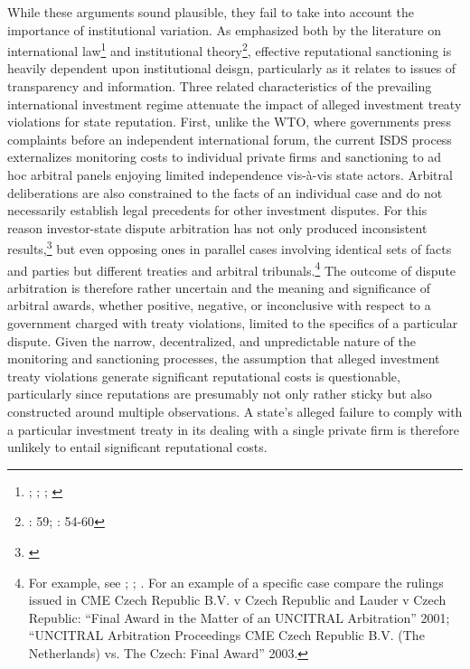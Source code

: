 \documentclass[12pt,onesided]{amsart}
\begin{document}
While these arguments sound plausible, they fail to take into account the importance of institutional variation. As emphasized both by the literature on international law\footnote{\citet{staton2011judicial}; \citet{cavallaro2008reevaluating}; \citet{guzman2008reputation}; \citet{guzman2008international}} and institutional theory\footnote{\citet{knight1992institutions}: 59; \citet{north1990institutions}: 54-60}, effective reputational sanctioning is heavily dependent upon institutional deisgn, particularly as it relates to issues of transparency and information. Three related characteristics of the prevailing international investment regime attenuate the impact of alleged investment treaty violations for state reputation. First, unlike the WTO, where governments press complaints before an independent international forum, the current ISDS process externalizes monitoring costs to individual private firms and sanctioning to ad hoc arbitral panels enjoying limited independence vis-\`{a}-vis state actors. Arbitral deliberations are also constrained to the facts of an individual case and do not necessarily establish legal precedents for other investment disputes. For this reason investor-state dispute arbitration has not only produced inconsistent results,\footnote{\citet{franck:2005}} but even opposing ones in parallel cases involving identical sets of facts and parties but different treaties and arbitral tribunals.\footnote{For example, see \citet{franck:2005}; \citet{kim2011annulment}; \citet{egli2006don}. For an example of a specific case compare the rulings issued in CME Czech Republic B.V. v Czech Republic and Lauder v Czech Republic: ``Final Award in the Matter of an UNCITRAL Arbitration'' 2001; ``UNCITRAL Arbitration Proceedings CME Czech Republic B.V. (The Netherlands) vs. The Czech: Final Award'' 2003.} The outcome of dispute arbitration is therefore rather uncertain and the meaning and significance of arbitral awards, whether positive, negative, or inconclusive with respect to a government charged with treaty violations, limited to the specifics of a particular dispute. Given the narrow, decentralized, and unpredictable nature of the monitoring and sanctioning processes, the assumption that alleged investment treaty violations generate significant reputational costs is questionable, particularly since reputations are presumably not only rather sticky but also constructed around multiple observations. A state's alleged failure to comply with a particular investment treaty in its dealing with a single private firm is therefore unlikely to entail significant reputational costs.
\end{document}
